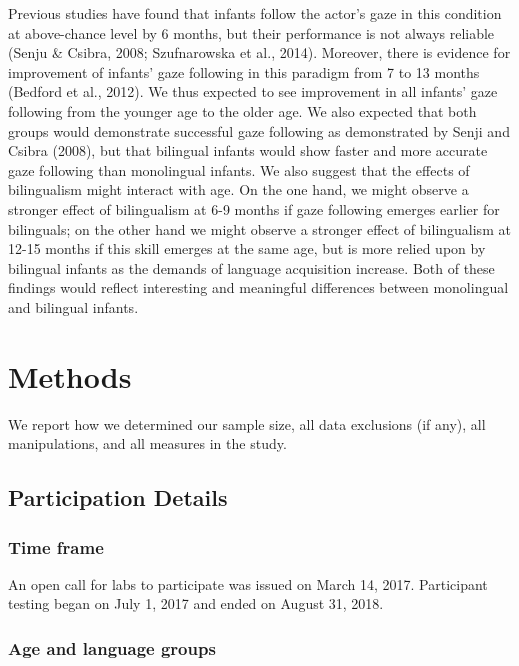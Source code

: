\documentclass[,man,floatsintext]{apa6}
\begin{document}
Previous studies have found that infants follow the actor's gaze in this condition at above-chance level by 6 months, but their performance is not always reliable (Senju \& Csibra, 2008; Szufnarowska et al., 2014). Moreover, there is evidence for improvement of infants' gaze following in this paradigm from 7 to 13 months (Bedford et al., 2012). We thus expected to see improvement in all infants' gaze following from the younger age to the older age. We also expected that both groups would demonstrate successful gaze following as demonstrated by Senji and Csibra (2008), but that bilingual infants would show faster and more accurate gaze following than monolingual infants. We also suggest that the effects of bilingualism might interact with age. On the one hand, we might observe a stronger effect of bilingualism at 6-9 months if gaze following emerges earlier for bilinguals; on the other hand we might observe a stronger effect of bilingualism at 12-15 months if this skill emerges at the same age, but is more relied upon by bilingual infants as the demands of language acquisition increase. Both of these findings would reflect interesting and meaningful differences between monolingual and bilingual infants.

\hypertarget{methods}{%
\section{Methods}\label{methods}}

We report how we determined our sample size, all data exclusions (if any), all manipulations, and all measures in the study.

\hypertarget{participation-details}{%
\subsection{Participation Details}\label{participation-details}}

\hypertarget{time-frame}{%
\subsubsection{Time frame}\label{time-frame}}

An open call for labs to participate was issued on March 14, 2017. Participant testing began on July 1, 2017 and ended on August 31, 2018.

\hypertarget{age-and-language-groups}{%
\subsubsection{Age and language groups}\label{age-and-language-groups}}
\end{document}
